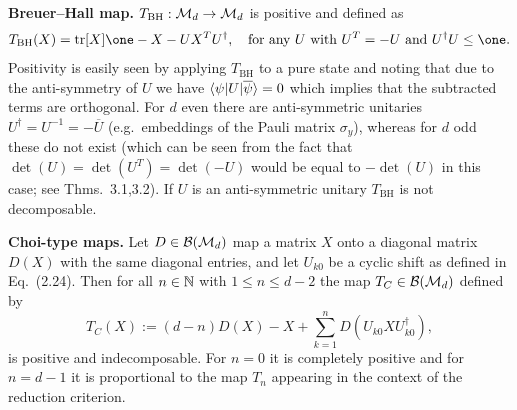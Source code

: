 \documentclass[11pt,a4paper]{article}
\numberwithin{equation}{section}
\begin{document}
\begin{example}
    \par\medskip\noindent\textbf{Breuer--Hall map.}
    $T_{\mathrm{BH}}:\mathcal{M}_d\to \mathcal{M}_d$ is positive and defined as
    \begin{equation}\label{eq:ch3:3.19}
        T_{\mathrm{BH}}(X)=\tr[X]\one - X - U X^T U^\dagger,
        \quad\text{for any $U$ with $U^T=-U$ and $U^\dagger U\le \one$.}
    \end{equation}
    Positivity is easily seen by applying $T_{\mathrm{BH}}$ to a pure state and noting that due to the anti-symmetry of
    $U$ we have $\langle\psi|U|\overline{\psi}\rangle=0$ which implies that the subtracted terms are orthogonal. For $d$ even
    there are anti-symmetric unitaries $U^\dagger=U^{-1}=-\overline{U}$ (e.g.\ embeddings of the Pauli matrix $\sigma_y$),
    whereas for $d$ odd these do not exist (which can be seen from the fact that $\det(U)=\det(U^T)=\det(-U)$ would be
    equal to $-\det(U)$ in this case; see Thms.~3.1,3.2). If $U$ is an anti-symmetric unitary $T_{\mathrm{BH}}$ is not
    decomposable.

    \par\medskip\noindent\textbf{Choi-type maps.}
    Let $D\in \mathcal{B}(\mathcal{M}_d)$ map a matrix $X$ onto a diagonal matrix $D(X)$ with the same diagonal entries, and let $U_{k0}$
    be a cyclic shift as defined in Eq.~(2.24). Then for all $n\in\mathbb{N}$ with $1\le n\le d-2$ the map
    $T_C\in \mathcal{B}(\mathcal{M}_d)$ defined by
    \begin{equation}\label{eq:ch3:3.20}
        T_C(X):=(d-n)D(X)-X+\sum_{k=1}^n D\!\left(U_{k0}XU_{k0}^\dagger\right),
    \end{equation}
    is positive and indecomposable. For $n=0$ it is completely positive and for $n=d-1$ it is proportional to the map
    $T_n$ appearing in the context of the reduction criterion.


\end{example}
\end{document}
